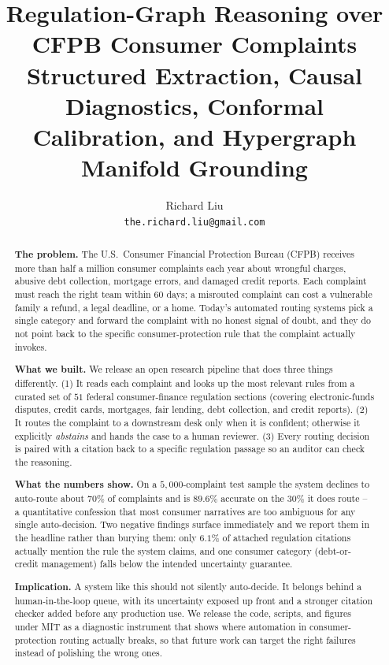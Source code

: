 \documentclass[11pt]{article}
\title{\textbf{Regulation-Graph Reasoning over CFPB Consumer Complaints}\\[2pt]
\large Structured Extraction, Causal Diagnostics, Conformal Calibration, and Hypergraph Manifold Grounding}
\author{Richard Liu \\ \small \texttt{the.richard.liu@gmail.com}}
\date{}
\begin{document}
\maketitle

\begin{abstract}
\noindent\textbf{The problem.} The U.S.\ Consumer Financial Protection
Bureau (CFPB) receives more than half a million consumer complaints each
year about wrongful charges, abusive debt collection, mortgage errors, and
damaged credit reports. Each complaint must reach the right team within
60 days; a misrouted complaint can cost a vulnerable family a refund, a
legal deadline, or a home. Today's automated routing systems pick a single
category and forward the complaint with no honest signal of doubt, and
they do not point back to the specific consumer-protection rule that the
complaint actually invokes.

\smallskip
\noindent\textbf{What we built.} We release an open research pipeline that
does three things differently. (1) It reads each complaint and looks up
the most relevant rules from a curated set of $51$ federal
consumer-finance regulation sections (covering electronic-funds disputes,
credit cards, mortgages, fair lending, debt collection, and credit
reports). (2) It routes the complaint to a downstream desk only when it is
confident; otherwise it explicitly \emph{abstains} and hands the case to a
human reviewer. (3) Every routing decision is paired with a citation back
to a specific regulation passage so an auditor can check the reasoning.

\smallskip
\noindent\textbf{What the numbers show.} On a $5{,}000$-complaint test
sample the system declines to auto-route about $70\%$ of complaints and is
$89.6\%$ accurate on the $30\%$ it does route -- a quantitative
confession that most consumer narratives are too ambiguous for any single
auto-decision. Two negative findings surface immediately and we report
them in the headline rather than burying them: only $6.1\%$ of attached
regulation citations actually mention the rule the system claims, and one
consumer category (debt-or-credit management) falls below the intended
uncertainty guarantee.

\smallskip
\noindent\textbf{Implication.} A system like this should not silently
auto-decide. It belongs behind a human-in-the-loop queue, with its
uncertainty exposed up front and a stronger citation checker added before
any production use. We release the code, scripts, and figures under MIT
as a diagnostic instrument that shows where automation in
consumer-protection routing actually breaks, so that future work can
target the right failures instead of polishing the wrong ones.
\end{abstract}
\end{document}
